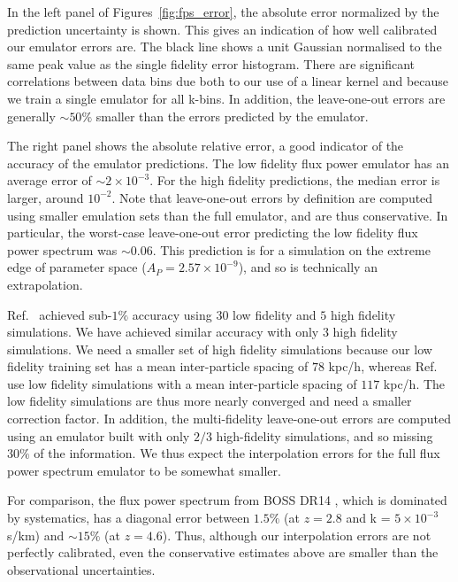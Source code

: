 \documentclass[a4paper,11pt]{article}
\begin{document}
In the left panel of Figures~\ref{fig:fps_error}, the absolute error normalized by the prediction uncertainty is shown. This gives an indication of how well calibrated our emulator errors are. The black line shows a unit Gaussian normalised to the same peak value as the single fidelity error histogram. There are significant correlations between data bins due both to our use of a linear kernel and because we train a single emulator for all k-bins. In addition, the leave-one-out errors are generally $\sim 50\%$ smaller than the errors predicted by the emulator.

The right panel shows the absolute relative error, a good indicator of the accuracy of the emulator predictions.
The low fidelity flux power emulator has an average error of $\sim 2\times 10^{-3}$. For the high fidelity predictions, the median error is larger, around $10^{-2}$. Note that leave-one-out errors by definition are computed using smaller emulation sets than the full emulator, and are thus conservative. In particular, the worst-case leave-one-out error predicting the low fidelity flux power spectrum was $\sim 0.06$. This prediction is for a simulation on the extreme edge of parameter space ($A_P = 2.57\times10^{-9}$), and so is technically an extrapolation.

Ref.~\cite{Fernandez:2022} achieved sub-$1\%$ accuracy using $30$ low fidelity and $5$ high fidelity simulations. We have achieved similar accuracy with only $3$ high fidelity simulations. We need a smaller set of high fidelity simulations because our low fidelity training set has a mean inter-particle spacing of $78$ kpc/h, whereas Ref.~\cite{Fernandez:2022} use low fidelity simulations with a mean inter-particle spacing of $117$ kpc/h. The low fidelity simulations are thus more nearly converged and need a smaller correction factor. In addition, the multi-fidelity leave-one-out errors are computed using an emulator built with only $2/3$ high-fidelity simulations, and so missing $30\%$ of the information. We thus expect the interpolation errors for the full flux power spectrum emulator to be somewhat smaller.


For comparison, the flux power spectrum from BOSS DR14 \cite{Chabanier:2019}, which is dominated by systematics, has a diagonal error between $1.5\%$ (at $z=2.8$ and k = $5\times 10^{-3}$ s/km) and $\sim 15\%$ (at $z=4.6$). Thus, although our interpolation errors are not perfectly calibrated, even the conservative estimates above are smaller than the observational uncertainties.
\end{document}
